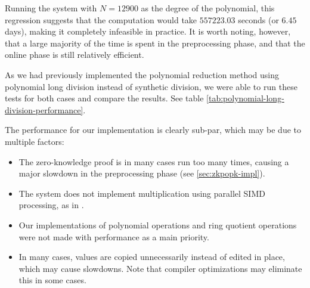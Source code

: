 \documentclass[../main.tex]{subfiles}
\begin{document}
Running the system with $N = 12900$ as the degree of the polynomial, this regression suggests that the computation would take $557223.03$ seconds (or $6.45$ days), making it completely infeasible in practice.
It is worth noting, however, that a large majority of the time is spent in the preprocessing phase, and that the online phase is still relatively efficient.

As we had previously implemented the polynomial reduction method using polynomial long division instead of synthetic division, we were able to run these tests for both cases and compare the results. See table \ref{tab:polynomial-long-division-performance}.

The performance for our implementation is clearly sub-par, which may be due to multiple factors:
\begin{itemize}
    \item The zero-knowledge proof is in many cases run too many times, causing a major slowdown in the preprocessing phase (see \ref{sec:zkpopk-impl}).
    \item The system does not implement multiplication using parallel SIMD processing, as in \cite{damgaard2012multiparty}.
    \item Our implementations of polynomial operations and ring quotient operations were not made with performance as a main priority.
    \item In many cases, values are copied unnecessarily instead of edited in place, which may cause slowdowns. Note that compiler optimizations may eliminate this in some cases.
\end{itemize}
\end{document}
